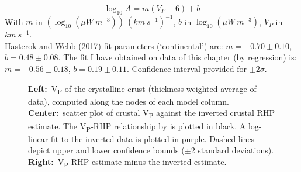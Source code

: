 \begin{subappendices}
\begin{equation*}
	\log_{10} A = m (V_{P} - 6) + b
\end{equation*}
With $m$ in $(\log_{10} (\mu W \ m^{-3})) \ (km \ s^{-1})^{-1}$, $b$ in $\log_{10} (\mu W \ m^{-3})$, $V_{P}$ in $km \ s^{-1}$. \\
Hasterok and Webb (2017) fit parameters (`continental') are: $m = -0.70 \pm 0.10$, $b = 0.48 \pm 0.08$.
The fit I have obtained on data of this chapter (by regression) is: $m = -0.56 \pm 0.18$, $b = 0.19 \pm 0.11$.
Confidence interval provided for $\pm 2 \sigma$.

\begin{figure}
	\begin{adjustbox}{center}
	\end{adjustbox}
	\caption[Relationship of RHP with V\textsubscript{P}, difference with fitted RHP.]{
		\textbf{Left:}~V\textsubscript{P} of the crystalline crust (thickness-weighted average of \cite{Pasyanos2014} data), computed along the nodes of each model column.
		\textbf{Center:}~scatter plot of crustal V\textsubscript{P} against the inverted crustal RHP estimate. The V\textsubscript{P}-RHP relationship by \cite{Hasterok2017_ign} is plotted in black. A log-linear fit to the inverted data is plotted in purple. Dashed lines depict upper and lower confidence bounds ($\pm$2 standard deviations).
		\textbf{Right:}~V\textsubscript{P}-RHP estimate minus the inverted estimate.}
	\label{fig:VpRHP}
\end{figure}

\end{subappendices}
